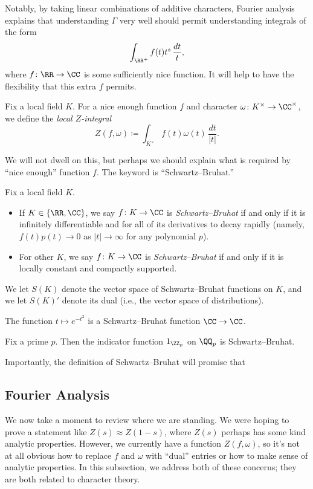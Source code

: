 \documentclass{article}
\begin{document}
Notably, by taking linear combinations of additive characters, Fourier analysis explains that understanding $\Gamma$ very well should permit understanding integrals of the form
\[\int_{\RR^+}f(t)t^s\,\frac{dt}t,\]
where $f\colon\RR\to\CC$ is some sufficiently nice function. It will help to have the flexibility that this extra $f$ permits.
\begin{definition}
	Fix a local field $K$. For a nice enough function $f$ and character $\omega\colon K^\times\to\CC^\times$, we define the \textit{local $Z$-integral}
	\[Z(f,\omega)\coloneqq\int_{K^\times}f(t)\omega(t)\,\frac{dt}{\left|t\right|}.\]
\end{definition}
We will not dwell on this, but perhaps we should explain what is required by ``nice enough'' function $f$. The keyword is ``Schwartz--Bruhat.''
\begin{definition}
	Fix a local field $K$.
	\begin{itemize}
		\item If $K\in\{\RR,\CC\}$, we say $f\colon K\to\CC$ is \textit{Schwartz--Bruhat} if and only if it is infinitely differentiable and for all of its derivatives to decay rapidly (namely, $f(t)p(t)\to0$ as $\left|t\right|\to\infty$ for any polynomial $p$).
		\item For other $K$, we say $f\colon K\to\CC$ is \textit{Schwartz--Bruhat} if and only if it is locally constant and compactly supported.
	\end{itemize}
	We let $S(K)$ denote the vector space of Schwartz--Bruhat functions on $K$, and we let $S(K)'$ denote its dual (i.e., the vector space of distributions).
\end{definition}
\begin{example}
	The function $t\mapsto e^{-t^2}$ is a Schwartz--Bruhat function $\CC\to\CC$.
\end{example}
\begin{example}
	Fix a prime $p$. Then the indicator function $1_{\ZZ_p}$ on $\QQ_p$ is Schwartz--Bruhat.
\end{example}
Importantly, the definition of Schwartz--Bruhat will promise that 

\subsection{Fourier Analysis}
We now take a moment to review where we are standing. We were hoping to prove a statement like $Z(s)\approx Z(1-s)$, where $Z(s)$ perhaps has some kind analytic properties. However, we currently have a function $Z(f,\omega)$, so it's not at all obvious how to replace $f$ and $\omega$ with ``dual'' entries or how to make sense of analytic properties. In this subsection, we address both of these concerns; they are both related to character theory.
\end{document}
